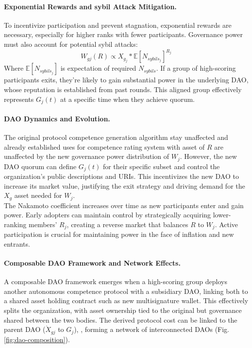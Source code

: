 \documentclass{article}
\begin{document}
\begin{CJK}{UTF8}{gbsn}
\begin{multicols}{2}
            \paragraph{Exponential Rewards and sybil Attack Mitigation.}
            To incentivize participation and prevent stagnation, exponential rewards are necessary, especially for higher ranks with fewer participants. Governance power must also account for potential sybil attacks:
            \begin{equation}
                W_{gj}(R) \propto  X_{g_j}*\mathbb{E}[N_{sybils_j}]^{R_j}
            \end{equation}
            Where $\mathbb{E}[N_{sybils_j}]$ is expectation of required $N_{sybils}$. If a group of high-scoring participants exits, they're likely to gain substantial power in the underlying DAO, whose reputation is established from past rounds. This aligned group effectively represents $G_j(t)$  at a specific time when they achieve quorum.

            \paragraph{DAO Dynamics and Evolution.} The original protocol competence generation algorithm stay unaffected and already established uses for competence rating system with asset of $R$ are unaffected by the new governance power distribution of $W_j$. However, the new DAO quorum can define $G_j(t)$ for their specific subset and control the organization's public descriptions and URIs. This incentivizes the new DAO to increase its market value, justifying the exit strategy and driving demand for the $X_g$ asset needed for $W_j$.\\
            The Nakamoto coefficient increases over time as new participants enter and gain power. Early adopters can maintain control by strategically acquiring lower-ranking members' $R_{j}$, creating a reverse market that balances $R$ to $W_j$. Active participation is crucial for maintaining power in the face of inflation and new entrants.
            \paragraph{Composable DAO Framework and Network Effects.}
            A composable DAO framework emerges when a high-scoring group deploys another autonomous competence protocol with a subsidiary DAO, linking both to a shared asset holding contract such as new multisignature wallet. This effectively splits the organization, with asset ownership tied to the original but governance shared between the two bodies. The derived protocol cost can be linked to the parent DAO ($ \grave{X}_{gj}$ to $G_j$), , forming a network of interconnected DAOs (Fig. \ref{fig:dao-composition}).




\end{multicols}
\end{CJK}
\end{document}
